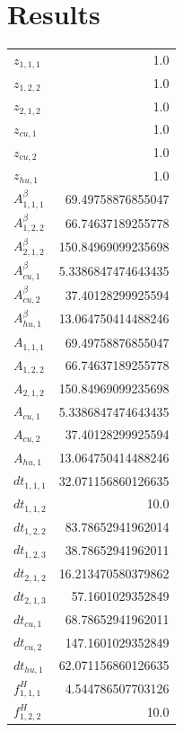 \documentclass{article}%
\makeatletter
\let\mcnewpage=\newpage%
\newcommand{\TrickSupertabularIntoMulticols}{%
\renewcommand\newpage{%
\if@firstcolumn%
\hrule width\linewidth height0pt%
\columnbreak%
\else%
\mcnewpage%
\fi%
}%
}%
\makeatother
\begin{document}
\section{Results}%
\thispagestyle{plain}%
\begin{multicols*}{3}%
\TrickSupertabularIntoMulticols%
%
\begin{supertabular}{lr}%
	$z_{1,1,1}$ & 1.0 \\%
	$z_{1,2,2}$ & 1.0 \\%
	$z_{2,1,2}$ & 1.0 \\%
	$z_{cu,1}$ & 1.0 \\%
	$z_{cu,2}$ & 1.0 \\%
	$z_{hu,1}$ & 1.0 \\%
	$A_{1,1,1}^{\beta}$ & 69.49758876855047 \\%
	$A_{1,2,2}^{\beta}$ & 66.74637189255778 \\%
	$A_{2,1,2}^{\beta}$ & 150.84969099235698 \\%
	$A_{cu,1}^{\beta}$ & 5.3386847474643435 \\%
	$A_{cu,2}^{\beta}$ & 37.40128299925594 \\%
	$A_{hu,1}^{\beta}$ & 13.064750414488246 \\%
	$A_{1,1,1}$ & 69.49758876855047 \\%
	$A_{1,2,2}$ & 66.74637189255778 \\%
	$A_{2,1,2}$ & 150.84969099235698 \\%
	$A_{cu,1}$ & 5.3386847474643435 \\%
	$A_{cu,2}$ & 37.40128299925594 \\%
	$A_{hu,1}$ & 13.064750414488246 \\%
	$dt_{1,1,1}$ & 32.071156860126635 \\%
	$dt_{1,1,2}$ & 10.0 \\%
	$dt_{1,2,2}$ & 83.78652941962014 \\%
	$dt_{1,2,3}$ & 38.78652941962011 \\%
	$dt_{2,1,2}$ & 16.213470580379862 \\%
	$dt_{2,1,3}$ & 57.1601029352849 \\%
	$dt_{cu,1}$ & 68.78652941962011 \\%
	$dt_{cu,2}$ & 147.1601029352849 \\%
	$dt_{hu,1}$ & 62.071156860126635 \\%
	$f_{1,1,1}^{H}$ & 4.544786507703126 \\%
	$f_{1,2,2}^{H}$ & 10.0 \\%

\end{supertabular}
\end{multicols*}
\end{document}
